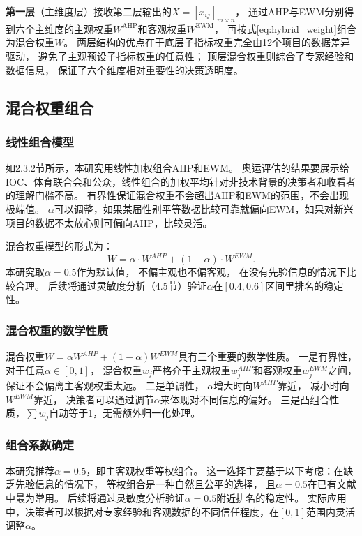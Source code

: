\documentclass[twoside]{CUGThesis}
\begin{document}
\textbf{第一层}（主维度层）接收第二层输出的$X = [x_{ij}]_{m \times n}$，
通过AHP与EWM分别得到六个主维度的主观权重$W^{\text{AHP}}$和客观权重$W^{\text{EWM}}$，
再按式\eqref{eq:hybrid_weight}组合为混合权重$W$。
两层结构的优点在于底层子指标权重完全由12个项目的数据差异驱动，
避免了主观预设子指标权重的任意性；
顶层混合权重则综合了专家经验和数据信息，
保证了六个维度相对重要性的决策透明度。

\subsection{混合权重组合}

\subsubsection{线性组合模型}

如2.3.2节所示，本研究用线性加权组合AHP和EWM。
奥运评估的结果要展示给IOC、体育联合会和公众，线性组合的加权平均针对非技术背景的决策者和收看者的理解门槛不高。
有界性保证混合权重不会超出AHP和EWM的范围，不会出现极端值。
$\alpha$可以调整，如果某届性别平等数据比较可靠就偏向EWM，如果对新兴项目的数据不太放心则可偏向AHP，比较灵活。

混合权重模型的形式为：
\begin{equation}
W = \alpha \cdot W^{AHP} + (1 - \alpha) \cdot W^{EWM} .
\label{eq:hybrid_weight}
\end{equation}
本研究取$\alpha = 0.5$作为默认值，
不偏主观也不偏客观，
在没有先验信息的情况下比较合理\cite{Zhang2023,Liang2023}。
后续将通过灵敏度分析（4.5节）验证$\alpha$在$[0.4, 0.6]$区间里排名的稳定性。

\subsubsection{混合权重的数学性质}

混合权重$W = \alpha W^{AHP} + (1-\alpha)W^{EWM}$具有三个重要的数学性质。
一是有界性，
对于任意$\alpha \in [0,1]$，
混合权重$w_j$严格介于主观权重$w_j^{AHP}$和客观权重$w_j^{EWM}$之间，
保证不会偏离主客观权重太远。
二是单调性，
$\alpha$增大时向$W^{AHP}$靠近，
减小时向$W^{EWM}$靠近，
决策者可以通过调节$\alpha$来体现对不同信息的偏好。
三是凸组合性质，$\sum w_j$自动等于1，无需额外归一化处理。

\subsubsection{组合系数确定}

本研究推荐$\alpha = 0.5$，即主客观权重等权组合。
这一选择主要基于以下考虑：在缺乏先验信息的情况下，
等权组合是一种自然且公平的选择，
且$\alpha = 0.5$在已有文献中最为常用\cite{Zhang2023,Liang2023}。
后续将通过灵敏度分析验证$\alpha = 0.5$附近排名的稳定性。
实际应用中，决策者可以根据对专家经验和客观数据的不同信任程度，在$[0,1]$范围内灵活调整$\alpha$。
\end{document}
